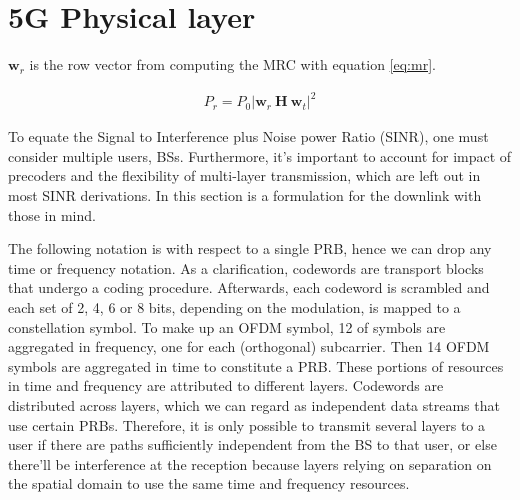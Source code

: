 \section{5G Physical layer}
\label{sec:radio}



$\bm{w}_r$ is the row vector from computing the \ac{MRC} with equation \ref{eq:mr}. 


\begin{align} \label{eq:rx_pow}
    P_r = P_0 \left|\bm{w}_r \ \bm{H} \ \bm{w}_t \right|^2 
\end{align}










To equate the Signal to Interference plus Noise power Ratio (\acs{SINR}), one must consider multiple users, \acp{BS}. Furthermore, it's important to account for impact of precoders and the flexibility of multi-layer transmission, which are left out in most \acs{SINR} derivations. In this section is a formulation for the downlink with those in mind.

The following notation is with respect to a single \acs{PRB}, hence we can drop any time or frequency notation.
As a clarification, codewords are transport blocks that undergo a coding procedure. Afterwards, each codeword is scrambled and each set of 2, 4, 6 or 8 bits, depending on the modulation, is mapped to a constellation symbol. To make up an \acs{OFDM} symbol, 12 of symbols are aggregated in frequency, one for each (orthogonal) subcarrier. Then 14 \acs{OFDM} symbols are aggregated in time to constitute a \acl{PRB}. These portions of resources in time and frequency are attributed to different layers. Codewords are distributed across layers, which we can regard as independent data streams that use certain \acsp{PRB}. Therefore, it is only possible to transmit several layers to a user if there are paths sufficiently independent from the \acs{BS} to that user, or else there'll be interference at the reception because layers relying on separation on the spatial domain to use the same time and frequency resources.

